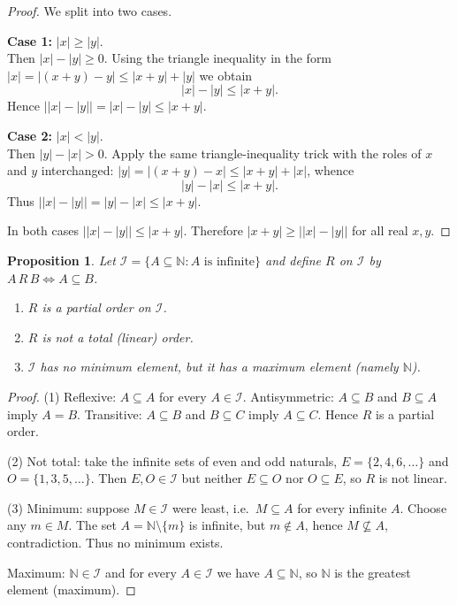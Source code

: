 \documentclass{article}
\theoremstyle{plain}
\newtheorem{proposition}{Proposition}
\theoremstyle{definition}
\theoremstyle{remark}
\begin{document}
\begin{proof}
We split into two cases.

\medskip
\noindent\textbf{Case 1:} \(|x|\ge |y|\). \\
Then \(|x|-|y|\ge0\). Using the triangle inequality in the form
\(|x|=|(x+y)-y|\le |x+y|+|y|\) we obtain
\[
|x|-|y| \le |x+y|.
\]
Hence \(\bigl||x|-|y|\bigr|=|x|-|y|\le |x+y|\).

\medskip
\noindent\textbf{Case 2:} \(|x|<|y|\). \\
Then \(|y|-|x|>0\). Apply the same triangle-inequality trick with the roles
of \(x\) and \(y\) interchanged:
\(|y|=|(x+y)-x|\le |x+y|+|x|\), whence
\[
|y|-|x| \le |x+y|.
\]
Thus \(\bigl||x|-|y|\bigr|=|y|-|x|\le |x+y|\).

\medskip
In both cases \(\bigl||x|-|y|\bigr|\le |x+y|\). Therefore
\(|x+y|\ge \bigl||x|-|y|\bigr|\) for all real \(x,y\).
\end{proof}
\begin{proposition}
Let $\mathcal I=\{A\subseteq\mathbb N: A\text{ is infinite}\}$ and define
$R$ on $\mathcal I$ by $A\,R\,B\iff A\subseteq B$.
\begin{enumerate}
  \item $R$ is a partial order on $\mathcal I$.
  \item $R$ is not a total (linear) order.
  \item $\mathcal I$ has no minimum element, but it has a maximum element (namely $\mathbb N$).
\end{enumerate}
\end{proposition}

\begin{proof}
(1) Reflexive: $A\subseteq A$ for every $A\in\mathcal I$.  
Antisymmetric: $A\subseteq B$ and $B\subseteq A$ imply $A=B$.  
Transitive: $A\subseteq B$ and $B\subseteq C$ imply $A\subseteq C$.  
Hence $R$ is a partial order.

\medskip\noindent
(2) Not total: take the infinite sets of even and odd naturals,
$E=\{2,4,6,\dots\}$ and $O=\{1,3,5,\dots\}$. Then $E,O\in\mathcal I$ but
neither $E\subseteq O$ nor $O\subseteq E$, so $R$ is not linear.

\medskip\noindent
(3) Minimum: suppose $M\in\mathcal I$ were least, i.e.\ $M\subseteq A$ for every
infinite $A$. Choose any $m\in M$. The set $A=\mathbb N\setminus\{m\}$ is
infinite, but $m\notin A$, hence $M\not\subseteq A$, contradiction. Thus no
minimum exists.

Maximum: $\mathbb N\in\mathcal I$ and for every $A\in\mathcal I$ we have
$A\subseteq\mathbb N$, so $\mathbb N$ is the greatest element (maximum).
\end{proof}
\end{document}
